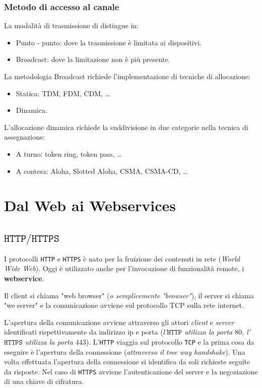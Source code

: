 \documentclass[oneside,a4paper,11pt]{book}
\theoremstyle{italicstyle}
\theoremstyle{normStyle}
\begin{document}
\subsection{Metodo di accesso al canale}
La modalità di trasmissione di distingue in:
\begin{itemize}
  \item Punto - punto: dove la trasmissione è limitata ai dispositivi.
  \item Broadcast: dove la limitazione non è più presente.
\end{itemize}
La metodologia Broadcast richiede l'implementazione di tecniche di allocazione:
\begin{itemize}
  \item Statica: TDM, FDM, CDM, \dots 
  \item Dinamica.
\end{itemize}
L'allocazione dinamica richiede la suddivisione in due categorie nella 
tecnica di assegnazione:
\begin{itemize}
  \item A turno: token ring, token pass, \dots
  \item A contesa: Aloha, Slotted Aloha, CSMA, CSMA-CD, \dots
\end{itemize}

\chapter{Dal Web ai Webservices}
\section{$\texttt{HTTP/HTTPS}$}
I protocolli \verb|HTTP| e \verb|HTTPS| è nato per la fruizione dei contenuti in rete (\textit{World Wide Web}). 
Oggi è utilizzato anche per l'invocazione di funzionalità remote, i \textbf{webservice}.

Il client si chiama "web browser" (\textit{o semplicemente "browser"}), 
il server si chiama "we server" e la 
comunicazione avviene sul protocollo TCP sulla rete internet.

L'apertura della comunicazione avviene attraverso gli attori \textit{client} e 
\textit{server} identificati rispettivamente da indirizzo ip e porta (\textit{l'$\texttt{HTTP}$ 
utilizza la porta $80$, l'$\texttt{HTTPS}$ utilizza la porta $443$}). 
L'\verb|HTTP| viaggia sul protocollo \verb|TCP| e la prima cosa da eseguire è l'apertura della
connessione (\textit{attraverso il tree way handshake}). 
Una volta effettuata l'apertura della connessione si identifica da soli richieste seguite da 
risposte.
Nel caso di \verb|HTTPS| avviene l'autenticazione del server e la negoziazione 
di una chiave di cifratura.
\end{document}
